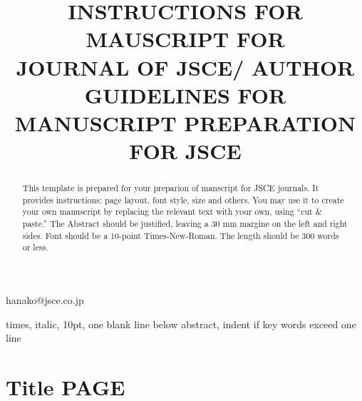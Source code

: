 \documentclass[english]{jjsce}
\begin{document}
\title{INSTRUCTIONS FOR MAUSCRIPT FOR\\
JOURNAL OF JSCE/ AUTHOR GUIDELINES FOR\\
MANUSCRIPT PREPARATION FOR JSCE}
{hanako@jsce.co.jp}


\begin{abstract}
This template is prepared for your preparion of manscript for JSCE journals. It provides instructions:
page layout, font style, size and others. You may use it to create your own manuscript by replacing the
relevant text with your own, using ``cut \& paste.'' The Abstract should be justified, leaving a 30 mm margine
on the left and right sides. Font should be a 10-point Times-New-Roman. The length should be 300 words
or less.
\end{abstract}
\begin{keyword}
times, italic, 10pt, one blank line below abstract, indent if key words exceed one line 
\end{keyword}
\maketitle

\section{Title PAGE}
\end{document}
